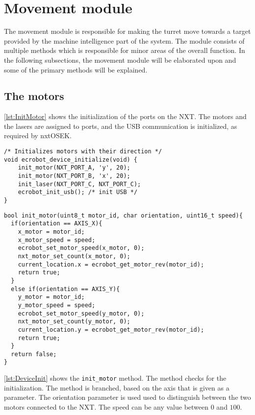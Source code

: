 \section{Movement module}
\label{sec:movement}
The movement module is responsible for making the turret move towards a target provided by the machine intelligence part of the system.
The module consists of multiple methods which is responsible for minor areas of the overall function.
In the following subsections, the movement module will be elaborated upon and some of the primary methods will be explained.

\subsection{The motors}
\autoref{lst:InitMotor} shows the initialization of the ports on the NXT.
The motors and the lasers are assigned to ports, and the USB communication is initialized, as required by nxtOSEK.
\begin{lstlisting}[language=CSharp, label={lst:DeviceInit},caption={ecrobot\_device\_initialize method from nxt.c}]
/* Initializes motors with their direction */
void ecrobot_device_initialize(void) {
    init_motor(NXT_PORT_A, 'y', 20);
    init_motor(NXT_PORT_B, 'x', 20);
    init_laser(NXT_PORT_C, NXT_PORT_C);
    ecrobot_init_usb(); /* init USB */
}
\end{lstlisting}

\begin{lstlisting}[language=CSharp,label={lst:InitMotor},caption={init\_motor method from movement.c}]
bool init_motor(uint8_t motor_id, char orientation, uint16_t speed){
  if(orientation == AXIS_X){
    x_motor = motor_id;
    x_motor_speed = speed;
    ecrobot_set_motor_speed(x_motor, 0);
    nxt_motor_set_count(x_motor, 0);
    current_location.x = ecrobot_get_motor_rev(motor_id);
    return true;
  }
  else if(orientation == AXIS_Y){
    y_motor = motor_id;
    y_motor_speed = speed;
    ecrobot_set_motor_speed(y_motor, 0);
    nxt_motor_set_count(y_motor, 0);
    current_location.y = ecrobot_get_motor_rev(motor_id);
    return true;
  }
  return false;
}
\end{lstlisting}
\autoref{lst:DeviceInit} shows the \texttt{init\_motor} method.
The method checks for the initialization.
The method is branched, based on the axis that is given as a parameter.
The orientation parameter is used used to distinguish between the two motors connected to the NXT.
The speed can be any value between $0$ and $100$.

